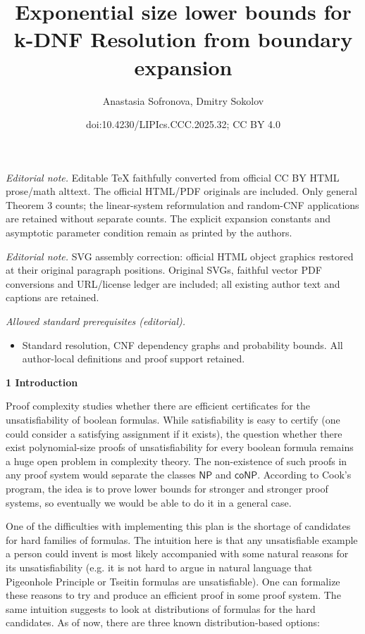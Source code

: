 \documentclass[10pt,a4paper]{article}
\title{Exponential size lower bounds for k-DNF Resolution from boundary expansion}
\author{Anastasia Sofronova, Dmitry Sokolov}
\date{doi:10.4230/LIPIcs.CCC.2025.32; CC BY 4.0}
\begin{document}
\maketitle
\noindent\textit{Editorial note.} Editable TeX faithfully converted from official CC BY HTML prose/math alttext. The official HTML/PDF originals are included. Only general Theorem 3 counts; the linear-system reformulation and random-CNF applications are retained without separate counts. The explicit expansion constants and asymptotic parameter condition remain as printed by the authors.\par\medskip
\noindent\textit{Editorial note.} SVG assembly correction: official HTML object graphics restored at their original paragraph positions. Original SVGs, faithful vector PDF conversions and URL/license ledger are included; all existing author text and captions are retained.\par\medskip
\noindent\textit{Allowed standard prerequisites (editorial).}\begin{itemize}
\item Standard resolution, CNF dependency graphs and probability bounds. All author-local definitions and proof support retained.
\end{itemize}\medskip


\par\medskip\noindent\textbf{
1 Introduction}\par




Proof complexity studies whether there are efficient certificates for the unsatisfiability of boolean
formulas. While satisfiability is easy to certify (one could consider a satisfying assignment if it
exists), the question whether there exist polynomial-size proofs of unsatisfiability for every
boolean formula remains a huge open problem in complexity theory. The non-existence of such proofs in any
proof system would separate the classes ${\mathsf{NP}}$ and ${\mathsf{coNP}}$. According to Cook’s program, the idea is to prove
lower bounds for stronger and stronger proof systems, so eventually we would be able to do it in a general
case.\par




One of the difficulties with implementing this plan is the shortage of candidates for hard families of
formulas. The intuition here is that any unsatisfiable example a person could invent is most likely
accompanied with some natural reasons for its unsatisfiability (e.g. it is not hard to argue in natural
language that Pigeonhole Principle or Tseitin formulas are unsatisfiable). One can formalize these
reasons to try and produce an efficient proof in some proof system. The same intuition suggests to look
at distributions of formulas for the hard candidates. As of now, there are three known distribution-based
options:\par
\end{document}

